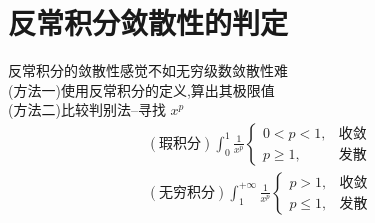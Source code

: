 \documentclass[12pt, a4paper, oneside, UTF8]{ctexbook}
\begin{document}
\section{ 反常积分敛散性的判定}
\begin{remark}
    反常积分的敛散性感觉不如无穷级数敛散性难 \\
    (方法一)使用反常积分的定义,算出其极限值 \\
    (方法二)比较判别法--寻找 $x^p$ 
    \begin{align*}
        (\text{瑕积分})\int_{0}^{1}\frac{1}{x^p}\begin{cases}
            0<p<1, &\text{收敛} \\
            p\geq 1, &\text{发散}
        \end{cases} \\
        (\text{无穷积分})\int_{1}^{+\infty}\frac{1}{x^p}\begin{cases}
            p > 1, &\text{收敛} \\
            p\leq 1, &\text{发散}
        \end{cases}
    \end{align*}
\end{remark}
\newpage
\end{document}
